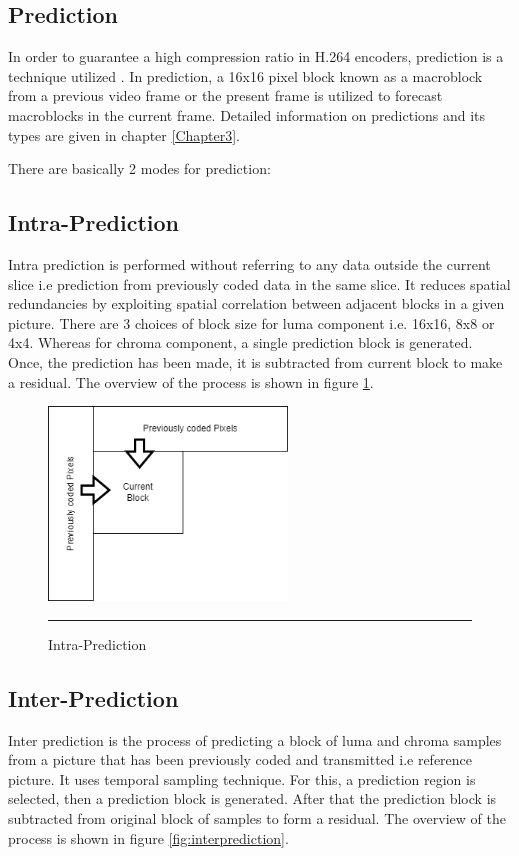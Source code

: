 \subsection{Prediction}
In order to guarantee a high compression ratio in H.264 encoders, prediction is a technique utilized \cite{richardson2010h264}. In prediction, a 16x16 pixel block known as a macroblock from a previous video frame or the present frame is utilized to forecast macroblocks in the current frame. Detailed information on predictions and its types are given in chapter \ref{Chapter3}.

There are basically 2 modes for prediction:

\subsection{Intra-Prediction}
Intra prediction is performed without referring to any data outside the current slice i.e prediction from previously coded data in the same slice. It reduces spatial redundancies by exploiting spatial correlation between adjacent blocks in a given picture. There are 3 choices of block size for luma component i.e. 16x16, 8x8 or 4x4. Whereas for chroma component, a single prediction block is generated. Once, the prediction has been made, it is subtracted from current block to make a residual. The overview of the process is shown in figure \ref{fig:intraprediction}.

\begin{figure}[H]
	\centering
	\includegraphics[width = 2.5in]{./Figures/comp1.png}
	\rule{35em}{0.5pt}
	\caption{Intra-Prediction}
	\label{fig:intraprediction}
\end{figure}

\subsection{Inter-Prediction}
Inter prediction is the process of predicting a block of luma and chroma samples from a picture that has been previously coded and transmitted i.e reference picture. It uses temporal sampling technique. For this, a prediction region is selected, then a prediction block is generated. After that the prediction block is subtracted from original block of samples to form a residual. The overview of the process is shown in figure \ref{fig:interprediction}.

